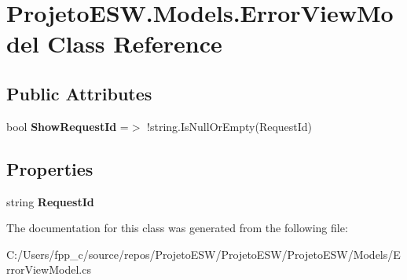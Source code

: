 \hypertarget{class_projeto_e_s_w_1_1_models_1_1_error_view_model}{}\section{Projeto\+E\+S\+W.\+Models.\+Error\+View\+Model Class Reference}
\label{class_projeto_e_s_w_1_1_models_1_1_error_view_model}
\subsection*{Public Attributes}
\begin{DoxyCompactItemize}
\item 
\mbox{\label{class_projeto_e_s_w_1_1_models_1_1_error_view_model_a1fba6dcda8d0937c35ff6466903cac56}} 
bool {\bfseries Show\+Request\+Id} =$>$ !string.\+Is\+Null\+Or\+Empty(Request\+Id)
\end{DoxyCompactItemize}
\subsection*{Properties}
\begin{DoxyCompactItemize}
\item 
\mbox{\label{class_projeto_e_s_w_1_1_models_1_1_error_view_model_abd2811c6c66d334209ea83553d9b8d1d}} 
string {\bfseries Request\+Id}
\end{DoxyCompactItemize}


The documentation for this class was generated from the following file\+:\begin{DoxyCompactItemize}
\item 
C\+:/\+Users/fpp\+\_\+c/source/repos/\+Projeto\+E\+S\+W/\+Projeto\+E\+S\+W/\+Projeto\+E\+S\+W/\+Models/Error\+View\+Model.\+cs\end{DoxyCompactItemize}
